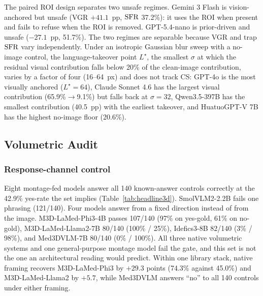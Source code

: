 The paired ROI design separates two unsafe regimes. Gemini 3 Flash is
vision-anchored but unsafe (VGR $+41.1$~pp, $\mathrm{SFR}$ 37.2\%): it uses the ROI
when present and fails to refuse when the ROI is removed. GPT-5.4-nano is
prior-driven and unsafe ($-27.1$~pp, 51.7\%). The two regimes are separable
because VGR and trap $\mathrm{SFR}$ vary independently. Under an isotropic Gaussian blur sweep with a no-image control, the
language-takeover point $L^{\star}$, the smallest $\sigma$ at which the
residual visual contribution falls below 20\% of the clean-image
contribution, varies by a factor of four (16--64~px) and does not track CS:
GPT-4o is the most visually anchored ($L^{\star}=64$), Claude Sonnet 4.6 has
the largest visual contribution (65.9\%$\rightarrow$9.1\%) but falls back at
$\sigma=32$, Qwen3.5-397B has the smallest contribution (40.5~pp) with the
earliest takeover, and HuatuoGPT-V 7B has the highest no-image floor
(20.6\%).


\subsection{Volumetric Audit}
\label{sec:results_3d}

\subsubsection{Response-channel control} Eight montage-fed models answer all
140 known-answer controls correctly at the 42.9\% yes-rate the set implies
(Table~\ref{tab:headline3d}). SmolVLM2-2.2B fails one phrasing (121/140).
Four models answer from a fixed direction instead of from the image.
M3D-LaMed-Phi3-4B passes 107/140 (97\% on yes-gold, 61\% on no-gold),
M3D-LaMed-Llama2-7B 80/140 (100\% / 25\%), Idefics3-8B 82/140 (3\% / 98\%),
and Med3DVLM-7B 80/140 (0\% / 100\%). All three native volumetric systems
and one general-purpose montage model fail the gate, and this set is not the
one an architectural reading would predict. Within one library stack, native framing recovers M3D-LaMed-Phi3 by
$+29.3$ points (74.3\% against 45.0\%) and M3D-LaMed-Llama2 by $+5.7$, while
Med3DVLM answers ``no'' to all 140 controls under either framing.

